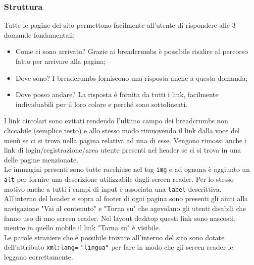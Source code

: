 \documentclass[12pt,a4paper,headings=optiontohead]{article}
\begin{document}
	\subsubsection{Struttura}
	Tutte le pagine del sito permettono facilmente all'utente di rispondere alle 3 domande fondamentali:
	\begin{itemize}
		\item Come ci sono arrivato? Grazie ai breadcrumbs è possibile risalire al percorso fatto per arrivare alla pagina;
		\item Dove sono? I breadcrumbs forniscono una risposta anche a questa domanda;
		\item Dove posso andare? La risposta è fornita da tutti i link, facilmente individuabili per il loro colore e perché sono sottolineati.
	\end{itemize} 
	I link circolari sono evitati rendendo l'ultimo campo dei breadcrumbs non cliccabile (semplice testo) e allo stesso modo rimuovendo il link dalla voce del menù se ci si trova nella pagina relativa ad una di esse. Vengono rimossi anche i link di login/registrazione/area utente presenti nel header se ci si trova in una delle pagine menzionate.  \\
	Le immagini presenti sono tutte racchiuse nel tag \texttt{img} e ad ognuna è aggiunto un \texttt{alt} per fornire una descrizione utilizzabile dagli screen reader. Per lo stesso motivo anche a tutti i campi di input è associata una \texttt{label} descrittiva. \\
	All'interno del header e sopra al footer di ogni pagina sono presenti gli aiuti alla navigazione "Vai al contenuto" e "Torna su" che agevolano gli utenti disabili che fanno uso di uno screen reader. Nel layout desktop questi link sono nascosti, mentre in quello mobile il link "Torna su" è visibile.\\
	Le parole straniere che è possibile trovare all'interno del sito sono dotate dell'attributo \texttt{xml:lang=} \texttt{"lingua"} per fare in modo che gli screen reader le leggano correttamente.
	
\end{document}
